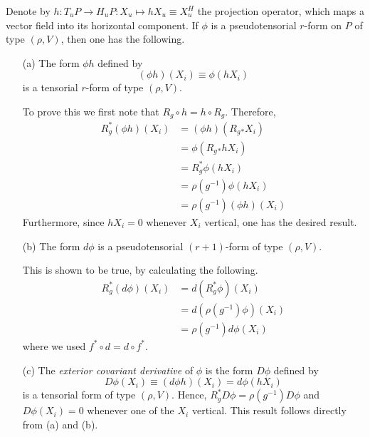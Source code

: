 \documentclass[10pt,reqno]{amsart}
\numberwithin{equation}{section}
\begin{document}
Denote by $h : T_uP \rightarrow H_uP : X_u \mapsto hX_u \equiv 
X^H_u$ the projection operator, which maps a vector field into 
its horizontal component. If $\phi$ is a pseudotensorial $r$-form 
on $P$ of type $(\rho,V)$, then one has the following.
%
\begin{itemize}
	\item[(a)] The form $\phi h$ defined by
		\begin{equation}
			(\phi h)(X_i) \equiv \phi(hX_i)
		\end{equation}
		is a tensorial $r$-form of type $(\rho,V)$.

		To prove this we first note that $R_g \circ h = h \circ R_g$.  
		Therefore,
		\begin{displaymath}
			\begin{split}
	R_g^\ast(\phi h)(X_i) &= (\phi h)(R_g{}_\ast X_i) \\
	&= \phi(R_g{}_\ast hX_i) \\
	&= R^\ast_g \phi(hX_i) \\
	&= \rho(g^{-1}) \phi(hX_i) \\
	&= \rho(g^{-1}) (\phi h)(X_i)
			\end{split}
		\end{displaymath}
		Furthermore, since $hX_i = 0$ whenever $X_i$ vertical, one 
		has the desired result.
	\item[(b)] The form $d\phi$ is a pseudotensorial $(r+1)$-form 
		of type $(\rho,V)$.

		This is shown to be true, by calculating the following.
		\begin{displaymath}
			\begin{split}
				R_g^\ast(d\phi)(X_i) &= d(R_g^\ast \phi)(X_i) \\
				&= d(\rho(g^{-1}) \phi)(X_i) \\
				&= \rho(g^{-1})d\phi(X_i)
			\end{split}
		\end{displaymath}
		where we used $f^\ast \circ d = d \circ f^\ast$.
	\item[(c)] The \emph{exterior covariant derivative} of $\phi$ 
		is the form $D\phi$ defined by
		\begin{equation}
			D\phi(X_i) \equiv (d\phi h)(X_i) = d\phi(hX_i)
		\end{equation}
		is a tensorial form of type $(\rho,V)$. Hence, $R_g^\ast 
		D\phi = \rho(g^{-1}) D\phi$ and $D\phi(X_i)=0$ whenever one 
		of the $X_i$ vertical. This result follows directly from (a) 
		and (b).
\end{itemize}
\end{document}
